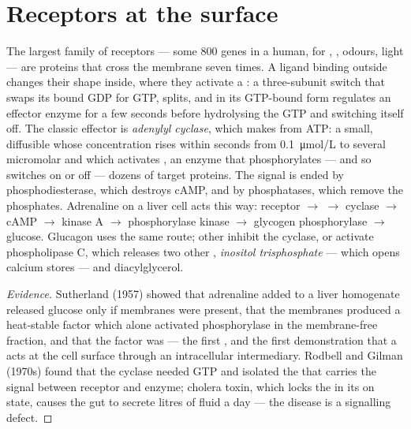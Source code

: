 \section{Receptors at the surface}

\begin{proposition}\label{prop:b2:cell-signalling:gpcr}
The largest family of receptors --- some \num{800} genes in a human,
for , , odours, light --- are proteins that
cross the membrane seven times. A ligand binding outside changes
their shape inside, where they activate a \emph{}: a
three-subunit switch that swaps its bound GDP for GTP, splits, and
in its GTP-bound form regulates an effector enzyme for a few seconds
before hydrolysing the GTP and switching itself off. The classic
effector is \emph{adenylyl cyclase}, which makes \emph{}
from ATP: a small, diffusible \emph{} whose
concentration rises within seconds from \qty{0.1}{\micro mol/L} to
several micromolar and which activates \emph{}, an
enzyme that phosphorylates --- and so switches on or off --- dozens
of target proteins. The signal is ended by phosphodiesterase, which
destroys cAMP, and by phosphatases, which remove the phosphates.
Adrenaline on a liver cell acts this way: receptor $\to$ 
$\to$ cyclase $\to$ cAMP $\to$ kinase A $\to$ phosphorylase kinase
$\to$ glycogen phosphorylase $\to$ glucose. Glucagon uses the same
route; other  inhibit the cyclase, or activate
phospholipase C, which releases two other ,
\emph{inositol trisphosphate} --- which opens calcium stores --- and
diacylglycerol.
\end{proposition}
\begin{proof}[Evidence]
Sutherland (1957) showed that adrenaline added to a liver
homogenate released glucose only if membranes were present, that
the membranes produced a heat-stable factor which alone activated
phosphorylase in the membrane-free fraction, and that the factor was
 --- the first , and the first
demonstration that a  acts at the cell surface through an
intracellular intermediary. Rodbell and Gilman (1970s) found that
the cyclase needed GTP and isolated the  that carries the
signal between receptor and enzyme; cholera toxin, which locks the
 in its on state, causes the gut to secrete litres of fluid
a day --- the disease is a signalling defect.
\end{proof}

